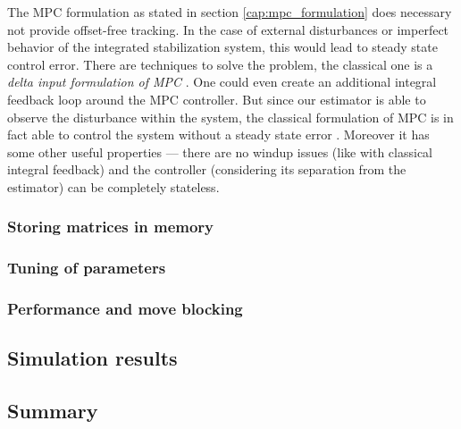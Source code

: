The MPC formulation as stated in section \ref{cap:mpc_formulation} does necessary not provide offset-free tracking. In the case of external disturbances or imperfect behavior of the integrated stabilization system, this would lead to steady state control error. There are techniques to solve the problem, the classical one is a \emph{delta input formulation of MPC} \citep{borrelli2007offsetfree}. One could even create an additional integral feedback loop around the MPC controller. But since our estimator is able to observe the disturbance within the system, the classical formulation of MPC is in fact able to control the system without a steady state error \citep{rossiter2013mpcpracticalapproach}. Moreover it has some other useful properties --- there are no windup issues (like with classical integral feedback) and the controller (considering its separation from the estimator) can be completely stateless.

\subsubsection{Storing matrices in memory}

\subsubsection{Tuning of parameters}

\subsubsection{Performance and move blocking}
\label{cap:implementation_performance}

\subsection{Simulation results}

\subsection{Summary}